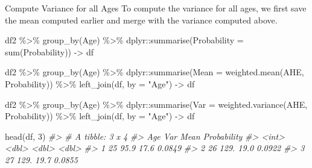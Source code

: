 \documentclass[
  11pt,
  ignorenonframetext,
  svgnames, handout, t]{beamer}
\newenvironment{Shaded}{\begin{snugshade}}{\end{snugshade}}
\newcommand{\AttributeTok}[1]{\textcolor[rgb]{0.77,0.63,0.00}{#1}}
\newcommand{\CommentTok}[1]{\textcolor[rgb]{0.56,0.35,0.01}{\textit{#1}}}
\newcommand{\DecValTok}[1]{\textcolor[rgb]{0.00,0.00,0.81}{#1}}
\newcommand{\FunctionTok}[1]{\textcolor[rgb]{0.00,0.00,0.00}{#1}}
\newcommand{\NormalTok}[1]{#1}
\newcommand{\OtherTok}[1]{\textcolor[rgb]{0.56,0.35,0.01}{#1}}
\newcommand{\SpecialCharTok}[1]{\textcolor[rgb]{0.00,0.00,0.00}{#1}}
\newcommand{\StringTok}[1]{\textcolor[rgb]{0.31,0.60,0.02}{#1}}
\begin{document}
\begin{frame}[fragile]{Compute Variance for all Ages}
\protect\hypertarget{compute-variance-for-all-ages}{}
To compute the variance for all ages, we first save the mean computed
earlier and merge with the variance computed above.

\footnotesize

\begin{Shaded}
\begin{Highlighting}[]
\NormalTok{df2 }\SpecialCharTok{\%\textgreater{}\%} \FunctionTok{group\_by}\NormalTok{(Age) }\SpecialCharTok{\%\textgreater{}\%}
\NormalTok{    dplyr}\SpecialCharTok{::}\FunctionTok{summarise}\NormalTok{(}\AttributeTok{Probability =} \FunctionTok{sum}\NormalTok{(Probability)) }\OtherTok{{-}\textgreater{}}\NormalTok{ df}

\NormalTok{df2 }\SpecialCharTok{\%\textgreater{}\%} \FunctionTok{group\_by}\NormalTok{(Age) }\SpecialCharTok{\%\textgreater{}\%}
\NormalTok{    dplyr}\SpecialCharTok{::}\FunctionTok{summarise}\NormalTok{(}\AttributeTok{Mean =} \FunctionTok{weighted.mean}\NormalTok{(AHE, Probability)) }\SpecialCharTok{\%\textgreater{}\%}
    \FunctionTok{left\_join}\NormalTok{(df, }\AttributeTok{by =} \StringTok{"Age"}\NormalTok{) }\OtherTok{{-}\textgreater{}}\NormalTok{ df}

\NormalTok{df2 }\SpecialCharTok{\%\textgreater{}\%} \FunctionTok{group\_by}\NormalTok{(Age) }\SpecialCharTok{\%\textgreater{}\%}
\NormalTok{    dplyr}\SpecialCharTok{::}\FunctionTok{summarise}\NormalTok{(}\AttributeTok{Var =} \FunctionTok{weighted.variance}\NormalTok{(AHE, Probability)) }\SpecialCharTok{\%\textgreater{}\%}
    \FunctionTok{left\_join}\NormalTok{(df, }\AttributeTok{by =} \StringTok{"Age"}\NormalTok{) }\OtherTok{{-}\textgreater{}}\NormalTok{ df}

\FunctionTok{head}\NormalTok{(df, }\DecValTok{3}\NormalTok{)}
\CommentTok{\#\textgreater{} \# A tibble: 3 x 4}
\CommentTok{\#\textgreater{}     Age   Var  Mean Probability}
\CommentTok{\#\textgreater{}   \textless{}int\textgreater{} \textless{}dbl\textgreater{} \textless{}dbl\textgreater{}       \textless{}dbl\textgreater{}}
\CommentTok{\#\textgreater{} 1    25  95.9  17.6      0.0849}
\CommentTok{\#\textgreater{} 2    26 129.   19.0      0.0922}
\CommentTok{\#\textgreater{} 3    27 129.   19.7      0.0855}
\end{Highlighting}
\end{Shaded}

\normalsize
\end{frame}
\end{document}
